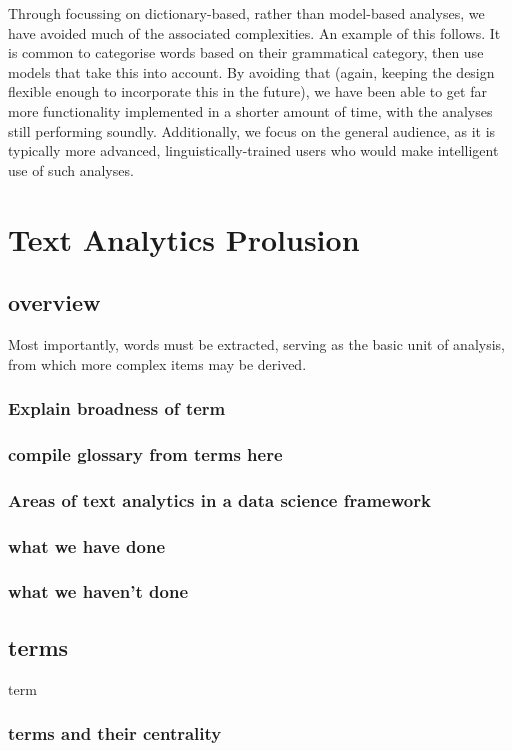 \documentclass[11pt, a4paper, oneside]{report}
\begin{document}
Through focussing on dictionary-based, rather than model-based
analyses, we have avoided much of the associated complexities. An
example of this follows. It is common to categorise words based on
their grammatical category, then use models that take this into
account. By avoiding that (again, keeping the design flexible enough
to incorporate this in the future), we have been able to get far more
functionality implemented in a shorter amount of time, with the
analyses still performing soundly. Additionally, we focus on the
general audience, as it is typically more advanced,
linguistically-trained users who would make intelligent use of such
analyses.

\chapter{Text Analytics Prolusion}
\label{cha:text-analyt-backgr}

\section{overview}
\label{sec:overview}
Most importantly, words must be extracted, serving as the basic unit
of analysis, from which more complex items may be derived.
\subsection{Explain broadness of term}
\subsection{compile glossary from terms here}
\subsection{Areas of text analytics in a data science framework}
\subsection{what we have done}
\subsection{what we haven't done}

\section{terms}
\label{sec:terms}
\gls{term}
\subsection{terms and their centrality}
\end{document}

